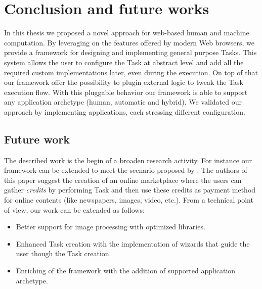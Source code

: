 \chapter{Conclusion and future works}
\label{cap:conclusion}

In this thesis we proposed a novel approach for web-based human and machine
computation. By leveraging on the features offered by modern Web browsers,
we provide a framework for designing and implementing general purpose Tasks.
This system allows the user to configure the Task at abstract level and add
all the required custom implementations later, even during the execution.
On top of that our framework offer the possibility to plugin external
logic to tweak the Task execution flow. With this pluggable behavior our framework
is able to support any application archetype (human, automatic and hybrid).
We validated our approach by implementing applications, each stressing different
configuration.

\section{Future work}
The described work is the begin of a broaden research activity. For instance our 
framework can be extended to meet the scenario proposed by \cite{karame2011pay}.
The authors of this paper suggest the creation of an online marketplace where
the users can gather \emph{credits} by performing Task and then use these credits
as payment method for online contents (like newspapers, images, video, etc.).
From a technical point of view, our work can be extended as follows:
\begin{itemize}
    \item Better support for image processing with optimized libraries.
    \item Enhanced Task creation with the implementation of wizards that guide
    the user though the Task creation.
    \item Enriching of the framework with the addition of supported application
    archetype.
\end{itemize}